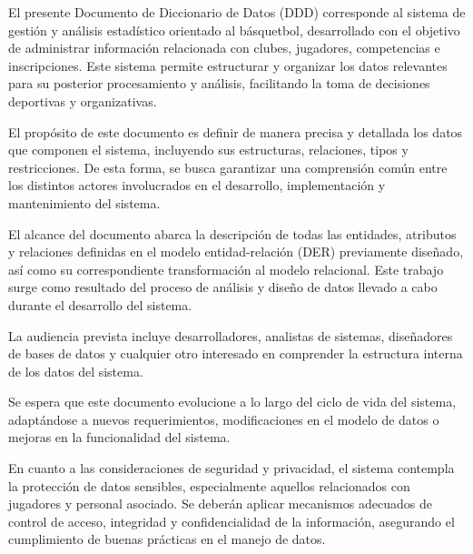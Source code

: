 El presente Documento de Diccionario de Datos (DDD) corresponde al sistema de gestión y análisis estadístico orientado al básquetbol, desarrollado con el objetivo de administrar información relacionada con clubes, jugadores, competencias e inscripciones. Este sistema permite estructurar y organizar los datos relevantes para su posterior procesamiento y análisis, facilitando la toma de decisiones deportivas y organizativas.

El propósito de este documento es definir de manera precisa y detallada los datos que componen el sistema, incluyendo sus estructuras, relaciones, tipos y restricciones. De esta forma, se busca garantizar una comprensión común entre los distintos actores involucrados en el desarrollo, implementación y mantenimiento del sistema.

El alcance del documento abarca la descripción de todas las entidades, atributos y relaciones definidas en el modelo entidad-relación (DER) previamente diseñado, así como su correspondiente transformación al modelo relacional. Este trabajo surge como resultado del proceso de análisis y diseño de datos llevado a cabo durante el desarrollo del sistema.

La audiencia prevista incluye desarrolladores, analistas de sistemas, diseñadores de bases de datos y cualquier otro interesado en comprender la estructura interna de los datos del sistema.

Se espera que este documento evolucione a lo largo del ciclo de vida del sistema, adaptándose a nuevos requerimientos, modificaciones en el modelo de datos o mejoras en la funcionalidad del sistema.

En cuanto a las consideraciones de seguridad y privacidad, el sistema contempla la protección de datos sensibles, especialmente aquellos relacionados con jugadores y personal asociado. Se deberán aplicar mecanismos adecuados de control de acceso, integridad y confidencialidad de la información, asegurando el cumplimiento de buenas prácticas en el manejo de datos.